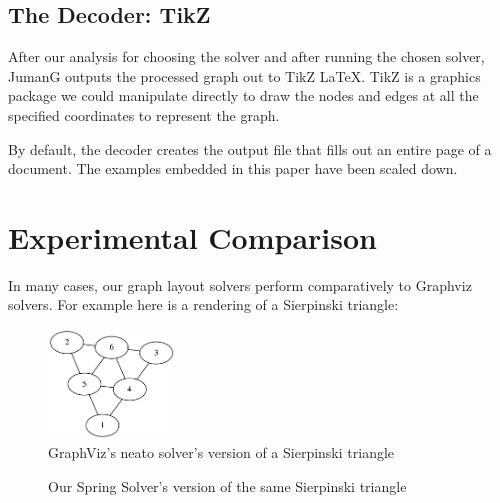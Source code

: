 \documentclass{article}
\begin{document}
\subsection{The Decoder: TikZ}
After our analysis for choosing the solver and after running the chosen solver, JumanG outputs the processed graph out to TikZ LaTeX. TikZ is a graphics package we could manipulate directly to draw the nodes and edges at all the specified coordinates to represent the graph.

By default, the decoder creates the output file that fills out an entire page of a document. The examples embedded in this paper have been scaled down.




\section{Experimental Comparison}

In many cases, our graph layout solvers perform comparatively to Graphviz solvers. For example here is a rendering of a Sierpinski triangle:

\begin{figure}[h!]
\caption{GraphViz's neato solver's version of a Sierpinski triangle}
\centering
\includegraphics[width=0.3\textwidth]{serp.png}
\end{figure}

\begin{figure}
\caption{Our Spring Solver's version of the same Sierpinski triangle}
\end{figure}
\end{document}
